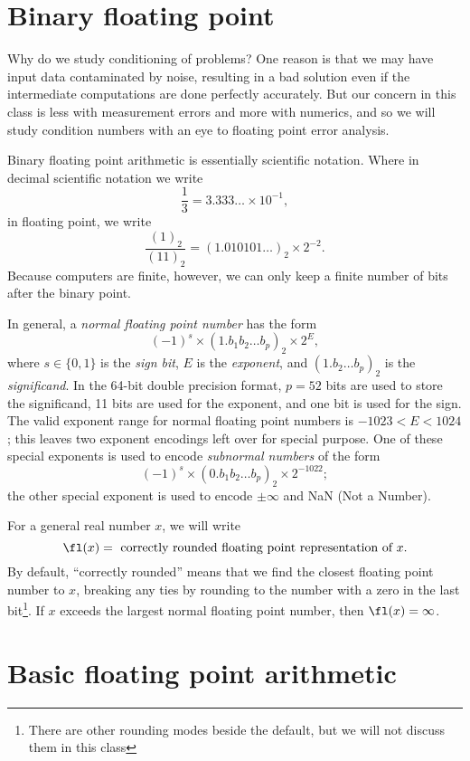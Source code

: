\documentclass[12pt, leqno]{article}
\begin{document}

\section*{Binary floating point}

Why do we study conditioning of problems?  One reason is that we may have
input data contaminated by noise, resulting in a bad solution even if the
intermediate computations are done perfectly accurately.  But our concern in
this class is less with measurement errors and more with numerics, and so
we will study condition numbers with an eye to floating point error analysis.

Binary floating point arithmetic is essentially scientific notation.
Where in decimal scientific notation we write
\[
  \frac{1}{3}
  = 3.333\ldots \times 10^{-1},
\]
in floating point, we write
\[
  \frac{(1)_2}{(11)_2}
  = (1.010101\ldots)_2 \times 2^{-2}.
\]
Because computers are finite, however, we can only keep a finite
number of bits after the binary point.

In general, a {\em normal floating point number} has the form
\[
  (-1)^s \times (1.b_1 b_2 \ldots b_p)_2 \times 2^{E},
\]
where $s \in \{0,1\}$ is the {\em sign bit},
$E$ is the {\em exponent}, and
$(1.b_2 \ldots b_p)_2$ is the {\em significand}.
In the 64-bit double precision format, $p = 52$ bits are used to store
the significand, 11 bits are used for the exponent, and one bit is
used for the sign.  The valid exponent range for normal floating point
numbers is $-1023 < E < 1024$; this leaves two exponent encodings left
over for special purpose.  One of these special exponents is used to
encode {\em subnormal numbers} of the form
\[
  (-1)^s \times (0.b_1 b_2 \ldots b_p)_2 \times 2^{-1022};
\]
the other special exponent is used to encode $\pm \infty$ and NaN
(Not a Number).

For a general real number $x$, we will write
\[
  \fl(x) = \mbox{ correctly rounded floating point representation of } x.
\]
By default, ``correctly rounded'' means that we find the closest
floating point number to $x$, breaking any ties by rounding to the
number with a zero in the last bit\footnote{%
There are other rounding modes beside the default, but we will not
discuss them in this class}.
If $x$ exceeds the largest normal floating point number,
then $\fl(x) = \infty$.

\section*{Basic floating point arithmetic}
\end{document}
